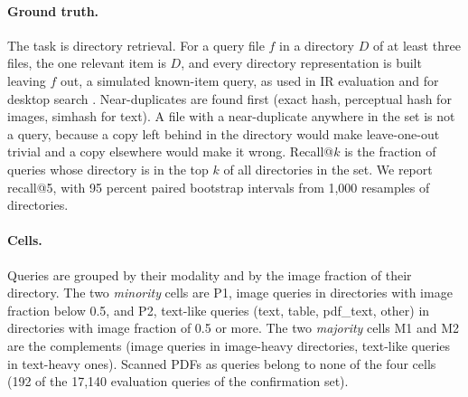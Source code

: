 \documentclass[sigconf,natbib=true,anonymous=true]{acmart}
\begin{document}
\begin{table}[t]
\caption{The draws of single folders, four of Zenodo records and two of GitHub directories. Directories per image-fraction bucket $[0,.2)$, $[.2,.5)$, $[.5,.8)$, $[.8,1]$; queries are leave-one-out files with a vector, after deduplication.}
\label{tab:corpora}
\setlength{\tabcolsep}{3pt}
\end{table}

\paragraph{Ground truth.} The task is directory retrieval. For a query file $f$ in a directory $D$ of at least three files, the one relevant item is $D$, and every directory representation is built leaving $f$ out, a simulated known-item query, as used in IR evaluation \citep{azzopardi2007simulated} and for desktop search \citep{kim2009pseudodesktop}. Near-duplicates are found first (exact hash, perceptual hash for images, simhash for text). A file with a near-duplicate anywhere in the set is not a query, because a copy left behind in the directory would make leave-one-out trivial and a copy elsewhere would make it wrong. Recall@$k$ is the fraction of queries whose directory is in the top $k$ of all directories in the set. We report recall@5, with 95 percent paired bootstrap intervals from 1,000 resamples of directories.

\paragraph{Cells.} Queries are grouped by their modality and by the image fraction of their directory. The two \emph{minority} cells are P1, image queries in directories with image fraction below 0.5, and P2, text-like queries (text, table, pdf\_text, other) in directories with image fraction of 0.5 or more. The two \emph{majority} cells M1 and M2 are the complements (image queries in image-heavy directories, text-like queries in text-heavy ones). Scanned PDFs as queries belong to none of the four cells (192 of the 17,140 evaluation queries of the confirmation set).
\end{document}

